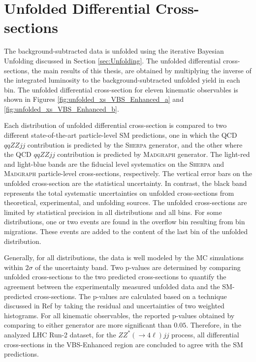 \section{ Unfolded Differential Cross-sections }
\label{sec:DifferentialxS}

The background-subtracted data is unfolded using the iterative Bayesian Unfolding discussed in Section \ref{sec:Unfolding}. The unfolded differential cross-sections, the main results of this thesis, are obtained by multiplying the inverse of the integrated luminosity to the background-subtracted unfolded yield in each bin. The unfolded differential cross-section for eleven kinematic observables is shown in Figures \ref{fig:unfolded_xs_VBS_Enhanced_a} and \ref{fig:unfolded_xs_VBS_Enhanced_b}. 

Each distribution of unfolded differential cross-section is compared to two different state-of-the-art particle-level SM predictions, one in which the QCD $qqZZjj$ contribution is predicted by the \textsc{Sherpa} generator, and the other where the QCD $qqZZjj$ contribution is predicted by \textsc{Madgraph} generator. The light-red and light-blue bands are the fiducial level systematics on the \textsc{Sherpa} and \textsc{Madgraph} particle-level cross-sections, respectively. The vertical error bars on the unfolded cross-section are the statistical uncertainty. In contrast, the black band represents the total systematic uncertainties on unfolded cross-sections from theoretical, experimental, and unfolding sources. The unfolded cross-sections are limited by statistical precision in all distributions and all bins. For some distributions, one or two events are found in the overflow bin resulting from bin migrations. These events are added to the content of the last bin of the unfolded distribution. 

Generally, for all distributions, the data is well modeled by the MC simulations within $2\sigma$ of the uncertainty band. Two p-values are determined by comparing unfolded cross-sections to the two predicted cross-sections to quantify the agreement between the experimentally measured unfolded data and the SM-predicted cross-sections. The p-values are calculated based on a technique discussed in Ref\cite{pValueStat} by taking the residual and uncertainties of two weighted histograms. For all kinematic observables, the reported p-values obtained by comparing to either generator are more significant than $0.05$. Therefore, in the analyzed LHC Run-2 dataset, for the $ZZ^*(\rightarrow 4 \ell) jj$ process, all differential cross-sections in the VBS-Enhanced region are concluded to agree with the SM predictions. 

